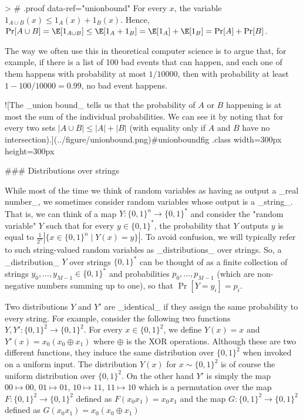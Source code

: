 > # {.proof data-ref="unionbound"}
For every $x$, the variable $1_{A\cup B}(x) \leq 1_A(x)+1_B(x)$.
Hence, $\Pr[A\cup B] = \E[ 1_{A \cup B} ] \leq \E[1_A+1_B] = \E[1_A]+\E[1_B] = \Pr[A]+\Pr[B]$.

The way we often use this in theoretical computer science is to argue that, for example, if there is a list of 100 bad events that can happen, and each one of them happens with probability at most $1/10000$, then with probability at least $1-100/10000 = 0.99$, no bad event happens.

![The _union bound_ tells us that the probability of $A$ or $B$ happening is at most the sum of the individual probabilities. We can see it by noting that for every two sets $|A\cup B| \leq |A|+|B|$ (with equality only if $A$ and $B$ have no intersection).](../figure/unionbound.png){#unionboundfig .class width=300px height=300px}

### Distributions over strings

While most of the time we think of random variables as having as output a _real number_, we sometimes consider random variables whose output is a _string_.
That is, we can think of a map $Y:\{0,1\}^n \rightarrow \{0,1\}^*$ and consider the "random variable" $Y$ such that for every $y\in \{0,1\}^*$, the probability that $Y$ outputs $y$ is equal to $\tfrac{1}{2^n}\left| \{ x \in \{0,1\}^n \;|\; Y(x)=y \}\right|$.
To avoid confusion, we will typically  refer to such string-valued random variables as _distributions_ over strings.
So, a _distribution_ $Y$ over strings $\{0,1\}^*$ can be thought of as a finite collection of strings $y_0,\ldots,y_{M-1} \in \{0,1\}^*$ and probabilities $p_0,\ldots,p_{M-1}$ (which are non-negative numbers summing up to one), so that $\Pr[ Y = y_i ] = p_i$.

Two distributions $Y$ and $Y'$ are _identical_ if they assign the same probability to every string.
For example, consider the following two functions $Y,Y':\{0,1\}^2 \rightarrow \{0,1\}^2$.
For every $x \in \{0,1\}^2$, we define $Y(x)=x$ and $Y'(x)=x_0(x_0\oplus x_1)$ where $\oplus$ is the XOR operations.
Although these are two different functions, they induce the same distribution over $\{0,1\}^2$ when invoked on a uniform input.
The distribution $Y(x)$ for $x\sim \{0,1\}^2$ is of course the uniform distribution over $\{0,1\}^2$.
On the other hand $Y'$ is simply the map $00 \mapsto 00$, $01 \mapsto 01$, $10 \mapsto 11$, $11 \mapsto 10$ which is a permutation over
the map $F:\{0,1\}^2 \rightarrow \{0,1\}^2$ defined as $F(x_0x_1)=x_0x_1$ and the map $G:\{0,1\}^2 \rightarrow \{0,1\}^2$  defined as $G(x_0x_1)=x_0(x_0 \oplus x_1)$

